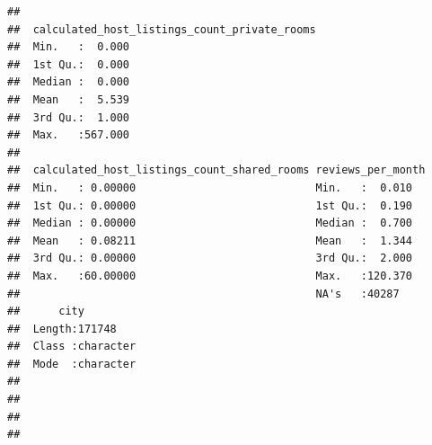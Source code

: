 \documentclass[
]{article}
\begin{document}
\begin{verbatim}
##                                             
##  calculated_host_listings_count_private_rooms
##  Min.   :  0.000                             
##  1st Qu.:  0.000                             
##  Median :  0.000                             
##  Mean   :  5.539                             
##  3rd Qu.:  1.000                             
##  Max.   :567.000                             
##                                              
##  calculated_host_listings_count_shared_rooms reviews_per_month
##  Min.   : 0.00000                            Min.   :  0.010  
##  1st Qu.: 0.00000                            1st Qu.:  0.190  
##  Median : 0.00000                            Median :  0.700  
##  Mean   : 0.08211                            Mean   :  1.344  
##  3rd Qu.: 0.00000                            3rd Qu.:  2.000  
##  Max.   :60.00000                            Max.   :120.370  
##                                              NA's   :40287    
##      city          
##  Length:171748     
##  Class :character  
##  Mode  :character  
##                    
##                    
##                    
## 
\end{verbatim}
\end{document}
